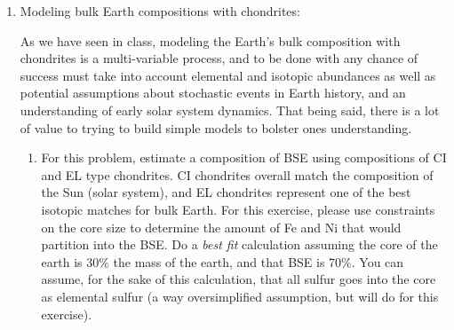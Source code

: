 \documentclass{template}
\begin{document}
\begin{enumerate}[label=\textbf{\arabic*.}]
\begin{enumerate}[label=\Alph*)]
{        The map was sized at 2 cm = 111 km (using the estimate that $1\degree \approx 111~\unit{km}$); the lengths of the lines (for 5 Ma, in order to fit on the map) are as follows:
            \begin{align*}
                \frac{68.62\,\unit{mm}}{1\unit{E}6\,\unit{mm/km}} \times 0.5 &= 343.1\,\unit{km}
                &
                \frac{117.13\,\unit{mm}}{1\unit{E}6\,\unit{mm/km}} \times 0.5 &= 585.65\,\unit{km} \\[1.5em]
                \frac{2\,\unit{cm}}{111\,\unit{km}} &= \frac{x\,\unit{cm}}{343.1\,\unit{km}}
                &
                \frac{2\,\unit{cm}}{111\,\unit{km}} &= \frac{x\,\unit{cm}}{585.65\,\unit{km}} \\[1.5em]
                \frac{343.1 \times 2}{111} &= 6.18\,\unit{cm}
                &
                \frac{585.65 \times 2}{111} &= 10.55\,\unit{cm}
            \end{align*}

            The volcanism is relatively more consistent with the NNR model; however, neither are very accurate at this location.
        }
    \end{enumerate}

    \item Modeling bulk Earth compositions with chondrites:

    As we have seen in class, modeling the Earth's bulk composition with chondrites is a multi-variable process, and to be done with any chance of success must take into account elemental and isotopic abundances as well as potential assumptions about stochastic events in Earth history, and an understanding of early solar system dynamics. That being said, there is a lot of value to trying to build simple models to bolster ones understanding.

    \begin{enumerate}[label=\Alph*)]
        \item For this problem, estimate a composition of BSE using compositions of CI and EL type chondrites. CI chondrites overall match the composition of the Sun (solar system), and EL chondrites represent one of the best isotopic matches for bulk Earth. For this exercise, please use constraints on the core size to determine the amount of Fe and Ni that would partition into the BSE. Do a \textit{best fit} calculation assuming the core of the earth is 30\% the mass of the earth, and that BSE is 70\%. You can assume, for the sake of this calculation, that all sulfur goes into the core as elemental sulfur (a way oversimplified assumption, but will do for this exercise).


\end{enumerate}
\end{enumerate}
\end{document}
